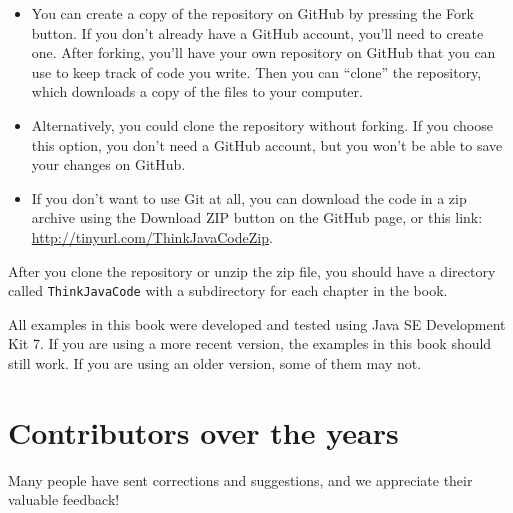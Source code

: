 \documentclass[12pt]{book}
\theoremstyle{exercise}
\begin{document}
\begin{itemize}

\item You can create a copy of the repository on GitHub by pressing the {\sf Fork} button.
If you don't already have a GitHub account, you'll need to create one.
After forking, you'll have your own repository on GitHub that you can use to keep track of code you write.
Then you can ``clone'' the repository, which downloads a copy of the files to your computer.


\item Alternatively, you could clone the repository without forking.
If you choose this option, you don't need a GitHub account, but you won't be able to save your changes on GitHub.


\item If you don't want to use Git at all, you can download the code in a zip archive using the {\sf Download ZIP} button on the GitHub page, or this link:
\url{http://tinyurl.com/ThinkJavaCodeZip}.

\end{itemize}

After you clone the repository or unzip the zip file, you should have a directory called {\tt ThinkJavaCode} with a subdirectory for each chapter in the book.

All examples in this book were developed and tested using Java SE Development Kit 7.
If you are using a more recent version, the examples in this book should still work.
If you are using an older version, some of them may not.


\section*{Contributors over the years}


Many people have sent corrections and suggestions, and we appreciate their valuable feedback!
\end{document}
